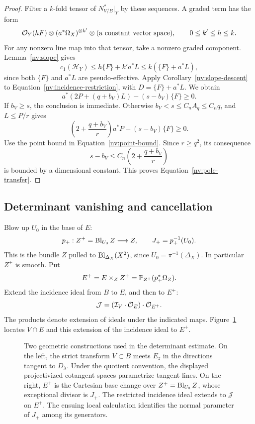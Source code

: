 \begin{proof}
Filter a \(k\)-fold tensor of \(N^*_{V/B}|_Y\) by these sequences.  A
graded term has the form
\[
 \mathcal O_Y(hF)\otimes(a^*\Omega_X)^{\otimes k'}
          \otimes(\text{a constant vector space}),
 \qquad 0\le k'\le h\le k.
\]
For any nonzero line map into that tensor, take a nonzero graded
component.  Lemma~\ref{nv:slope} gives
\[
 c_1(\mathscr H_Y)\le h\{F\}+k'a^*L
                 \le k(\{F\}+a^*L),
\]
since both \(\{F\}\) and \(a^*L\) are pseudo-effective.  Apply
Corollary~\ref{nv:slope-descent} to
Equation~\eqref{nv:incidence-restriction}, with
\(D=\{F\}+a^*L\).  We obtain
\begin{equation}\label{nv:incidence-base}
 a^*(2P+(q+b_V)L)-(s-b_V)\{F\}\ge0.
\end{equation}
If \(b_V\ge s\), the conclusion is immediate.  Otherwise
\(b_V<s\le C_nA_q\le C_nq\), and \(L\le P/r\) gives
\[
 \left(2+\frac{q+b_V}{r}\right)a^*P-(s-b_V)\{F\}\ge0.
\]
Use the point bound in Equation~\eqref{nv:point-bound}.  Since \(r\ge q^2\), its
consequence
\[
 s-b_V\le C_n\left(2+\frac{q+b_V}{r}\right)
\]
is bounded by a dimensional constant.  This proves
Equation~\eqref{nv:pole-transfer}.
\end{proof}

\subsection{Determinant vanishing and cancellation}

Blow up \(U_0\) in the base of \(E\):
\[
 p_+:Z^+=\operatorname{Bl}_{U_0}Z\longrightarrow Z,\qquad J_+=p_+^{-1}(U_0).
\]
This is the bundle \(Z\) pulled to \(\operatorname{Bl}_{\Delta_X}(X^2)\), since
\(U_0=\pi^{-1}(\Delta_X)\).  In particular \(Z^+\) is smooth.  Put
\[
 E^+=E\times_Z Z^+=\mathbb P_{Z^+}(p_+^*\Omega_Z).
\]
Extend the incidence ideal from \(B\) to \(E\), and then to \(E^+\):
\[
 \mathcal J=(\mathcal I_V\cdot\mathcal O_E)\cdot\mathcal O_{E^+}.
\]
The products denote extension of ideals under the indicated maps.
Figure~\ref{nv:two-diagonals} locates \(V\cap E\) and this extension of
the incidence ideal to \(E^+\).

\begin{figure}[ht]
\centering

\caption{Two geometric constructions used in the determinant estimate.
On the left, the strict transform \(V\subset B\) meets \(E_z\) in the
directions tangent to \(D_\lambda\).  Under the quotient convention,
the displayed projectivized cotangent spaces parametrize tangent lines.
On the right, \(E^+\) is the Cartesian base change
over \(Z^+=\operatorname{Bl}_{U_0}Z\), whose exceptional divisor is \(J_+\).
The restricted incidence ideal extends to \(\mathcal J\) on \(E^+\).
The ensuing local calculation identifies the normal parameter of \(J_+\)
among its generators.}
\label{nv:two-diagonals}
\end{figure}

